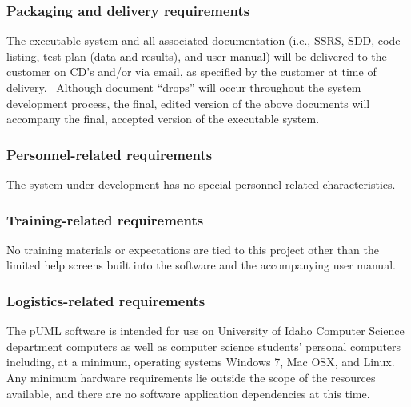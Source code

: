 \documentclass[twoside,letterpaper]{article}
\begin{document}
\subsubsection[Packaging and delivery requirements]{\rmfamily\bfseries\color{black}
Packaging and delivery requirements}
{\color{black}
The executable system and all associated documentation (i.e., SSRS, SDD,
code listing, test plan (data and results), and user manual) will be
delivered to the customer on CD{\textquoteright}s and/or via email, as
specified by the customer at time of delivery. \ Although document
{\textquotedblleft}drops{\textquotedblright} will occur throughout the
system development process, the final, edited version of the above
documents will accompany the final, accepted version of the executable
system.}

\subsubsection[Personnel{}-related requirements]{\rmfamily\bfseries\color{black}
Personnel-related requirements}
{\color{black}
The system under development has no special personnel-related
characteristics. }

\subsubsection[Training{}-related requirements]{\rmfamily\bfseries\color{black}
Training-related requirements}
{\color{black}
No training materials or expectations are tied to this project other
than the limited help screens built into the software and the
accompanying user manual.}

\subsubsection[Logistics{}-related requirements]{\rmfamily\bfseries\color{black}
Logistics-related requirements}
{\color{black}
The pUML software is intended for use on University of Idaho Computer Science department computers as well as computer science students' personal computers including, at a minimum, operating systems Windows 7, Mac OSX, and Linux.
Any minimum hardware requirements lie outside the scope of the resources available,
and there are no software application dependencies at this time.
}
\end{document}

